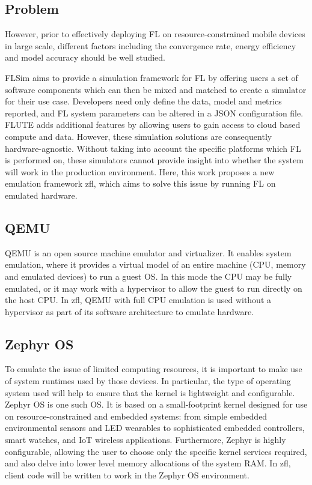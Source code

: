 \documentclass[12pt]{article}
\begin{document}
\subsection{Problem}
However, prior to effectively deploying FL on resource-constrained mobile devices in large scale, different factors including the convergence rate, energy efficiency and model accuracy should be well studied.

FLSim\cite{} aims to provide a simulation framework for FL by offering users a set of software components
which can then be mixed and matched to create a simulator for their use case. Developers need only
define the data, model and metrics reported, and FL system parameters can be altered in a JSON
configuration file. FLUTE\cite{} adds additional features by allowing users to gain access to cloud based
compute and data. However, these simulation solutions are consequently hardware-agnostic. Without
taking into account the specific platforms which FL is performed on, these simulators cannot provide
insight into whether the system will work in the production environment. Here, this work proposes
a new emulation framework zfl, which aims to solve this issue by running FL on emulated hardware.

\subsection{QEMU}
QEMU\cite{} is an open source machine emulator and virtualizer. It enables system emulation, where it
provides a virtual model of an entire machine (CPU, memory and emulated devices) to run a guest OS.
In this mode the CPU may be fully emulated, or it may work with a hypervisor to allow the guest to
run directly on the host CPU. In zfl, QEMU with full CPU emulation is used without a hypervisor as
part of its software architecture to emulate hardware.

\subsection{Zephyr OS}
To emulate the issue of limited computing resources, it is important to make use of system runtimes
used by those devices. In particular, the type of operating system used will help to ensure that the kernel is
lightweight and configurable.
Zephyr OS\cite{} is one such OS. It is based on a small-footprint kernel designed for use on resource-constrained and embedded systems: from simple embedded environmental sensors and LED wearables to sophisticated embedded controllers, smart watches, and IoT wireless applications.
Furthermore, Zephyr is highly configurable, allowing the user to choose only the specific kernel
services required, and also delve into lower level memory allocations of the system RAM. In zfl,
client code will be written to work in the Zephyr OS environment.
\end{document}
